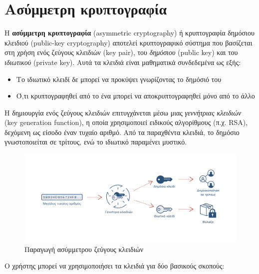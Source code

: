 \section{Ασύμμετρη κρυπτογραφία}

Η \textbf{ασύμμετρη κρυπτογραφία} (asymmetric cryptography) ή κρυπτογραφία δημόσιου κλειδιού (public-key cryptography) αποτελεί κρυπτογραφικό σύστημα που βασίζεται στη χρήση ενός ζεύγους κλειδιών (key pair), του \textit{δημόσιου} (public key) και του \textit{ιδιωτικού} (private key). Αυτά τα κλειδιά είναι μαθηματικά συνδεδεμένα ως εξής:

\begin{itemize}
	\item Το ιδιωτικό κλειδί δε μπορεί να προκύψει γνωρίζοντας το δημόσιό του
	\item Ό,τι κρυπτογραφηθεί από το ένα μπορεί να αποκρυπτογραφηθεί μόνο από το άλλο 
\end{itemize}
	
Η δημιουργία ενός ζεύγους κλειδιών επιτυγχάνεται μέσω μιας \textit{γεννήτριας κλειδιών} (key generation function), η οποία χρησιμοποιεί ειδικούς αλγορίθμους (π.χ. RSA), δεχόμενη ως είσοδο έναν τυχαίο αριθμό. Από τα παραχθέντα κλειδιά, το δημόσιο γνωστοποιείται σε τρίτους, ενώ το ιδιωτικό παραμένει μυστικό.

\begin{figure}[H]
	\centering
	\includegraphics[width=15cm]{assets/figures/asymmetric-key-generation.png}
	\caption{Παραγωγή ασύμμετρου ζεύγους κλειδιών}
\end{figure}

Ο χρήστης μπορεί να χρησιμοποιήσει τα κλειδιά για δύο βασικούς σκοπούς:

